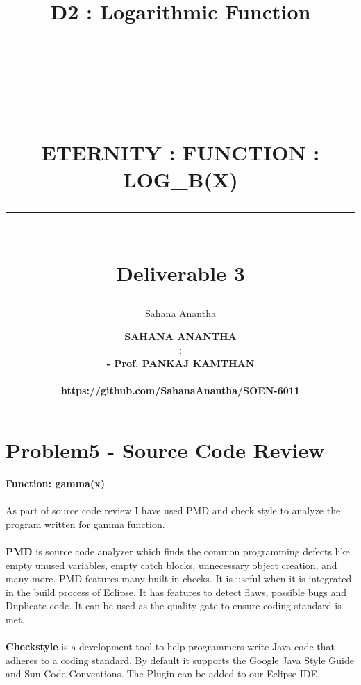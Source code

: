 \documentclass[12pt]{report}
\title{D2 : Logarithmic Function}
\author{Sahana Anantha}
\date{}
\newcommand{\HRule}[1]{\rule{\linewidth}{#1}}
\begin{document}
\title{ \Large {}
		\\ [2.0cm]
		\HRule{2pt} \\ [0.5cm]
		\LARGE \textbf{\uppercase{ETERNITY : function : log_{b}(x)}}\\
		\HRule{2pt} \\ [0.5cm]
		\textbf{{\Large Deliverable 3}}\\
		\normalsize  \vspace*{5\baselineskip}}

\date{}
\author{\LARGE \textbf{
		SAHANA ANANTHA \\
		\Large {} : \\
        \Large {} - Prof. PANKAJ KAMTHAN  \\
\Large {}\\
\small \text  https://github.com/SahanaAnantha/SOEN-6011 \\}}

\maketitle


\renewcommand{\thesection}{\arabic{section}}
\section{Problem5 - Source Code Review}

\large\textbf{Function: gamma(x)}

\paragraph{}As part of source code review I have used PMD and check style to analyze the program written for gamma function. 

\paragraph{} \textbf{PMD} is source code analyzer which finds the common programming defects like empty unused variables, empty catch blocks, unnecessary object creation, and many more. PMD features many built in checks. It is useful when it is integrated in the build process of Eclipse. It has features to detect flaws, possible bugs and Duplicate code. It can be used as the quality gate to ensure coding standard is met.

\paragraph{} \textbf{Checkstyle} is a development tool to help programmers write Java code that adheres to a coding standard. By default it supports the Google Java Style Guide and Sun Code Conventions. The Plugin can be added to our Eclipse IDE.
\end{document}
